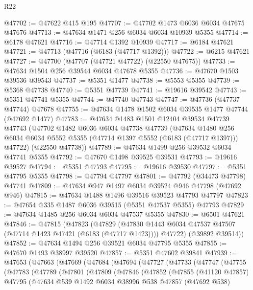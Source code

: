 \begin{lexlean}{R22}
\begin{coremodule}
@47702 := @47622 @415 @195
@47707 := @47702 @1473 @6036 @6034 @47675 @47676
@47713 := @47634 @1471 @256 @6034 @6034 @10939 @5355
@47714 := @6178 @47621
@47716 := @47714 @1392 @10939
@47717 := @6184 @47621
@47721 := @47713 (@47716 (@6183 (@47717 @1392)))
@47722 := @6215 @47621
@47727 := @47700 (@47707 (@47721 @47722) (@22550 @47675))
@47733 := @47634 @1504 @256 @39544 @6034 @47678 @5355
@47736 := @47670 @1503 @39536 @39543
@47737 := @5351 @1477
@47738 := @5553 @5355
@47739 := @5368 @47738
@47740 := @5351 @47739
@47741 := @19616 @39542
@47743 := @5351 @47741 @5355
@47744 := @47740 @47743
@47747 := @47736 (@47737 @47744) @47678
@47755 := @47634 @1478 @1502 @6034 @39535 @1477 @47744 (@47692 @1477)
@47783 := @47634
    @1483
    @1501
    @12404
    @39534
    @47739
    @47743
    (@47702
      @1482
      @6036
      @6034
      @47738
      @47739
      (@47634 @1480 @256 @6034 @6034 @5552 @5355 (@47714 @1397 @5552 (@6183 (@47717 @1397))) @47722)
      (@22550 @47738))
@47789 := @47634 @1499 @256 @39532 @6034 @47741 @5355
@47792 := @47670 @1498 @39525 @39531
@47793 := @19616 @39527
@47794 := @5351 @47793
@47795 := @19616 @39530
@47797 := @5351 @47795 @5355
@47798 := @47794 @47797
@47801 := @47792 (@34473 @47798) @47741
@47809 := @47634 @947 @1497 @6034 @39524 @946 @47798 (@47692 @946)
@47815 := @47634 @1488 @1496 @39516 @39523 @47793 @47797
@47823 := @47654 @335 @1487 @6036 @39515 (@5351 @47537 @5355) @47793
@47829 := @47634 @1485 @256 @6034 @6034 @47537 @5355
@47830 := @6501 @47621
@47846 := @47815
    (@47823
      (@47829
        (@47830 @1443 @6034 @47537 @47507 (@47714 @1423 @47421 (@6183 (@47717 @1423))))
        @47722)
      (@39892 @39514))
@47852 := @47634 @1494 @256 @39521 @6034 @47795 @5355
@47855 := @47670 @1493 @38997 @39520
@47857 := @5351 @47602 @39841
@47939 := @47653
    (@47663
      (@47669
        (@47684
          (@47694
            (@47727
              (@47733
                (@47747
                  (@47755
                    (@47783
                      (@47789
                        (@47801
                          (@47809
                            (@47846
                              (@47852
                                (@47855
                                  (@41120 @47857)
                                  @47795
                                  (@47634
                                    @539
                                    @1492
                                    @6034
                                    @38996
                                    @538
                                    @47857
                                    (@47692 @538)

\end{coremodule}
\end{lexlean}
